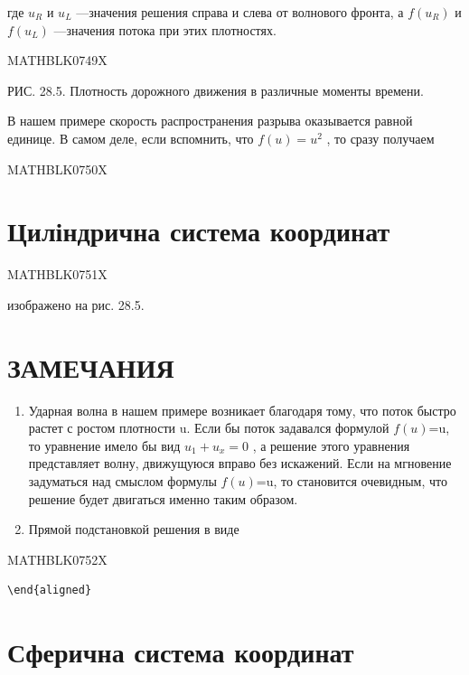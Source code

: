 \documentclass[
]{article}
\begin{document}
{{{где \(u_R\) и \(u_L\) ---значения решения справа и слева от волнового
фронта, а \(f(u_R)\) и \(f(u_L)\) ---значения потока при этих
плотностях.

MATHBLK0749X

РИС. 28.5. Плотность дорожного движения в различные моменты времени.

В нашем примере скорость распространения разрыва оказывается равной
единице. В самом деле, если вспомнить, что \(f(u) = u^2\) , то сразу
получаем

MATHBLK0750X

\section{Циліндрична система
координат}\label{ux446ux438ux43bux456ux43dux434ux440ux438ux447ux43dux430-ux441ux438ux441ux442ux435ux43cux430-ux43aux43eux43eux440ux434ux438ux43dux430ux442}

MATHBLK0751X

изображено на рис. 28.5.

\section{ЗАМЕЧАНИЯ}\label{ux437ux430ux43cux435ux447ux430ux43dux438ux44f-9}

\begin{enumerate}
\def\labelenumi{\arabic{enumi}.}
\item
  Ударная волна в нашем примере возникает благодаря тому, что поток
  быстро растет с ростом плотности u. Если бы поток задавался формулой
  \(f(u)\)=u, то уравнение имело бы вид \(u_1+u_x=0\) , а решение этого
  уравнения представляет волну, движущуюся вправо без искажений. Если на
  мгновение задуматься над смыслом формулы \(f(u)\)=u, то становится
  очевидным, что решение будет двигаться именно таким образом.
\item
  Прямой подстановкой решения в виде
\end{enumerate}

MATHBLK0752X

\begin{verbatim}
\end{aligned}
\end{verbatim}

\section{Сферична система
координат}\label{ux441ux444ux435ux440ux438ux447ux43dux430-ux441ux438ux441ux442ux435ux43cux430-ux43aux43eux43eux440ux434ux438ux43dux430ux442}

}}}
\end{document}
